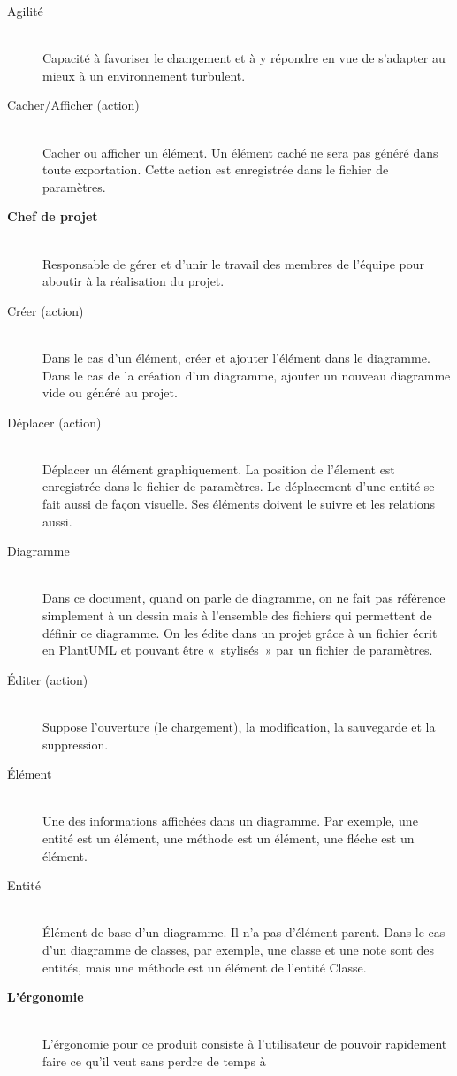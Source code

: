 \documentclass[hidelinks, 10pt,a4paper]{article}
\begin{document}
\begin{description}
  \item[Agilité]~\\ Capacité à favoriser le changement et à y répondre en vue de s'adapter au mieux à un environnement turbulent.
  \item[Cacher/Afficher (action)]~\\ Cacher ou afficher un élément. Un élément caché ne sera pas généré dans toute exportation. Cette action est enregistrée 
	dans le fichier de paramètres.
	 \item[\textbf{Chef de projet}]~\\ Responsable de gérer et d'unir le travail des membres de l'équipe pour aboutir à la réalisation du projet.
 \item[Créer (action)]~\\ Dans le cas d’un élément, créer et ajouter l’élément dans le diagramme. Dans le cas de la création d’un diagramme, ajouter un nouveau diagramme 
  vide ou généré au projet.
   \item[Déplacer (action)]~\\ Déplacer un élément graphiquement. La position de l’élement est enregistrée dans le fichier de paramètres. Le déplacement d'une entité 
  se fait aussi de façon visuelle. Ses éléments doivent le suivre et les relations aussi.
    \item[Diagramme]~\\ Dans ce document, quand on parle de diagramme, on ne fait pas référence simplement à un dessin mais à l’ensemble 
			des fichiers qui permettent de définir ce diagramme. On les édite dans un projet grâce à un fichier écrit en PlantUML 
			et pouvant être «~stylisés~» par un fichier de paramètres.
   \item[Éditer (action)]~\\ Suppose l’ouverture (le chargement), la modification, la sauvegarde et la suppression.
  \item[Élément]~\\ Une des informations affichées dans un diagramme. Par exemple, une entité est un élément, une méthode est un élément, une fléche est un élément.
  \item[Entité]~\\ Élément de base d’un diagramme. Il n’a pas d’élément parent. Dans le cas d’un diagramme de classes, par exemple, une classe et une note sont des
      entités, mais une méthode est un élément de l’entité Classe.
    \item[\textbf{L'érgonomie}]~\\ L'érgonomie pour ce produit consiste à l'utilisateur de pouvoir rapidement faire ce qu'il veut sans perdre de temps à 

\end{description}
\end{document}
